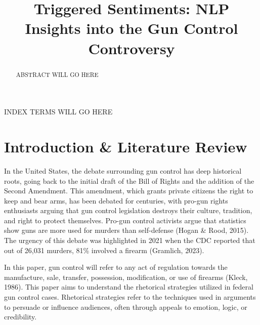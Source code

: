 \documentclass[conference]{IEEEtran}
\begin{document}
\title{Triggered Sentiments: NLP Insights into the Gun Control Controversy}

\author{
}

\maketitle

\begin{abstract}
    ABSTRACT WILL GO HERE
\end{abstract}

\begin{IEEEkeywords}
    INDEX TERMS WILL GO HERE
\end{IEEEkeywords}

\section{Introduction \& Literature Review}
In the United States, the debate surrounding gun control has deep historical roots, going back to the initial draft of the Bill of Rights and the addition of the Second Amendment. This amendment, which grants private citizens the right to keep and bear arms, has been debated for centuries, with pro-gun rights enthusiasts arguing that gun control legislation destroys their culture, tradition, and right to protect themselves. Pro-gun control activists argue that statistics show guns are more used for murders than self-defense (Hogan \& Rood, 2015). The urgency of this debate was highlighted in 2021 when the CDC reported that out of 26,031 murders, 81\% involved a firearm (Gramlich, 2023).

In this paper, gun control will refer to any act of regulation towards the manufacture, sale, transfer, possession, modification, or use of firearms (Kleck, 1986). This paper aims to understand the rhetorical strategies utilized in federal gun control cases. Rhetorical strategies refer to the techniques used in arguments to persuade or influence audiences, often through appeals to emotion, logic, or credibility.
\end{document}
